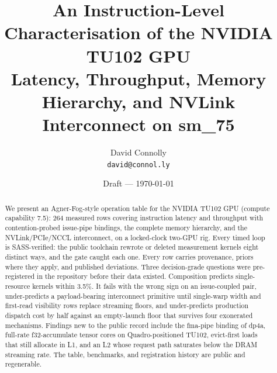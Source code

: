 \documentclass[11pt]{article}
\title{\bfseries An Instruction-Level Characterisation of the NVIDIA
  TU102 GPU\\[0.3em]
  \large\mdseries Latency, Throughput, Memory Hierarchy, and NVLink
  Interconnect on sm\_75}
\author{David Connolly\\[0.2em]\normalsize\texttt{david@connol.ly}}
\date{\normalsize Draft --- \today}
\begin{document}
\maketitle

\begin{abstract}
\noindent
We present an Agner-Fog-style operation table for the NVIDIA TU102 GPU
(compute capability 7.5): 264 measured rows covering instruction latency
and throughput with contention-probed issue-pipe bindings, the complete
memory hierarchy, and the NVLink/PCIe/NCCL interconnect, on a locked-clock
two-GPU rig. Every timed loop is SASS-verified: the public toolchain
rewrote or deleted measurement kernels eight distinct ways, and the gate
caught each one. Every row carries provenance, priors where they apply,
and published deviations. Three decision-grade questions were
pre-registered in the repository before their data existed.
Composition predicts single-resource kernels within 3.5\%. It fails
with the wrong sign on an issue-coupled pair, under-predicts a
payload-bearing interconnect primitive until single-warp width and
first-read visibility rows replace streaming floors, and under-predicts
production dispatch cost by half against an empty-launch floor that
survives four exonerated mechanisms. Findings new to the
public record include the fma-pipe binding of dp4a, full-rate
f32-accumulate tensor cores on Quadro-positioned TU102, evict-first loads
that still allocate in L1, and an L2 whose request path saturates below
the DRAM streaming rate. The table, benchmarks, and registration history
are public and regenerable.
\end{abstract}














\end{document}
